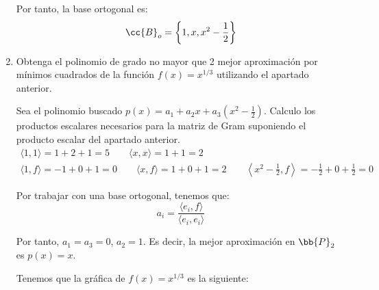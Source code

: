 \begin{ejercicio}
\begin{enumerate}
        Por tanto, la base ortogonal es:
        \begin{equation*}
            \cc{B}_o = \left\{1,x,x^2-\frac{1}{2}\right\}
        \end{equation*}

        \item Obtenga el polinomio de grado no mayor que 2 mejor aproximación por mínimos cuadrados de la función
        $f(x) = x^{1/3}$ utilizando el apartado anterior.

        Sea el polinomio buscado $p(x)=a_1 + a_2x + a_3\left(x^2-\frac{1}{2}\right)$. Calculo los productos escalares necesarios para la matriz de Gram suponiendo el producto escalar del apartado anterior.
        \begin{gather*}
            \langle 1,1\rangle = 1+2+1=5 \qquad
            \langle x,x\rangle = 1+1=2 \qquad
            \\
            \langle 1,f\rangle = -1+0+1=0 \qquad
            \langle x,f\rangle = 1+0+1=2 \qquad
            \left\langle x^2-\frac{1}{2},f\right\rangle = -\frac{1}{2}+0+\frac{1}{2}=0 \qquad
        \end{gather*}

        Por trabajar con una base ortogonal, tenemos que:
        \begin{equation*}
            a_i = \frac{\langle e_i, f\rangle}{\langle e_i, e_i \rangle}
        \end{equation*}

        Por tanto, $a_1=a_3 = 0$, $a_2=1$. Es decir, la mejor aproximación en $\bb{P}_2$ es $p(x)=x$.
        \begin{observacion} Tenemos que la gráfica de $f(x)=x^{1/3}$ es la siguiente:
            \begin{figure}[H]
                \centering
\end{figure}
\end{observacion}
\end{enumerate}
\end{ejercicio}
